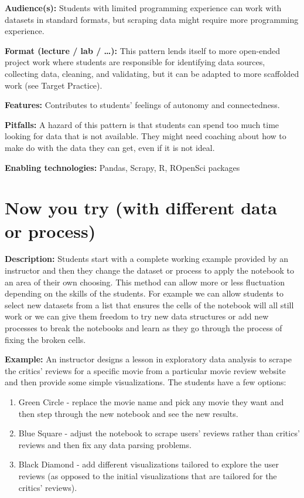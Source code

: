 \documentclass[]{book}
\providecommand{\tightlist}{%
  \setlength{\itemsep}{0pt}\setlength{\parskip}{0pt}}
\begin{document}
\textbf{Audience(s):}
Students with limited programming experience can work with datasets in standard
formats, but scraping data might require more programming experience.

\textbf{Format (lecture / lab / \ldots):}
This pattern lends itself to more open-ended project work where students are responsible
for identifying data sources, collecting data, cleaning, and validating, but it can
be adapted to more scaffolded work (see Target Practice).

\textbf{Features:}
Contributes to students' feelings of autonomy and connectedness.

\textbf{Pitfalls:}
A hazard of this pattern is that students can spend too much time looking for data
that is not available. They might need coaching about how to make do with the data
they can get, even if it is not ideal.

\textbf{Enabling technologies:}
Pandas, Scrapy, R, ROpenSci packages

\hypertarget{now-you-try-with-different-data-or-process}{%
\section{Now you try (with different data or process)}\label{now-you-try-with-different-data-or-process}}

\textbf{Description:}
Students start with a complete working example provided by an instructor and
then they change the dataset or process to apply the notebook to an area of
their own choosing. This method can allow more or less fluctuation depending on
the skills of the students. For example we can allow students to select new
datasets from a list that ensures the cells of the notebook will all still work
or we can give them freedom to try new data structures or add new processes to
break the notebooks and learn as they go through the process of fixing the
broken cells.

\textbf{Example:}
An instructor designs a lesson in exploratory data analysis to scrape the
critics' reviews for a specific movie from a particular movie review website and
then provide some simple visualizations. The students have a few options:

\begin{enumerate}
\def\labelenumi{\arabic{enumi}.}
\tightlist
\item
  Green Circle - replace the movie name and pick any movie they want and then
  step through the new notebook and see the new results.
\item
  Blue Square - adjust the notebook to scrape users' reviews rather than critics'
  reviews and then fix any data parsing problems.
\item
  Black Diamond - add different visualizations tailored to explore the user
  reviews (as opposed to the initial visualizations that are tailored for the
  critics' reviews).
\end{enumerate}
\end{document}
